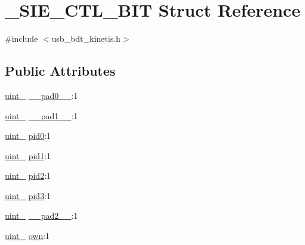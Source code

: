 \hypertarget{struct___s_i_e___c_t_l___b_i_t}{}\section{\+\_\+\+S\+I\+E\+\_\+\+C\+T\+L\+\_\+\+B\+IT Struct Reference}
\label{struct___s_i_e___c_t_l___b_i_t}


{\ttfamily \#include $<$usb\+\_\+bdt\+\_\+kinetis.\+h$>$}

\subsection*{Public Attributes}
\begin{DoxyCompactItemize}
\item 
\hyperlink{types_8h_ad3209046c23f739a81581c10a4be7d92}{uint\+\_} \hyperlink{struct___s_i_e___c_t_l___b_i_t_a89dc65f6660587a4914d62e005f32607}{\+\_\+\+\_\+pad0\+\_\+\+\_\+}\+:1
\item 
\hyperlink{types_8h_ad3209046c23f739a81581c10a4be7d92}{uint\+\_} \hyperlink{struct___s_i_e___c_t_l___b_i_t_a5a35cc1ec0035e0f1be992c18857a8b2}{\+\_\+\+\_\+pad1\+\_\+\+\_\+}\+:1
\item 
\hyperlink{types_8h_ad3209046c23f739a81581c10a4be7d92}{uint\+\_} \hyperlink{struct___s_i_e___c_t_l___b_i_t_a0b5e23e6030cbc40b1435185eee883b5}{pid0}\+:1
\item 
\hyperlink{types_8h_ad3209046c23f739a81581c10a4be7d92}{uint\+\_} \hyperlink{struct___s_i_e___c_t_l___b_i_t_a18fdff82280502521ab7c3fc987c77d2}{pid1}\+:1
\item 
\hyperlink{types_8h_ad3209046c23f739a81581c10a4be7d92}{uint\+\_} \hyperlink{struct___s_i_e___c_t_l___b_i_t_a32f6384fbb76a43f9b2f180727e06609}{pid2}\+:1
\item 
\hyperlink{types_8h_ad3209046c23f739a81581c10a4be7d92}{uint\+\_} \hyperlink{struct___s_i_e___c_t_l___b_i_t_a1936a9b54096104134e40bd17104bf1f}{pid3}\+:1
\item 
\hyperlink{types_8h_ad3209046c23f739a81581c10a4be7d92}{uint\+\_} \hyperlink{struct___s_i_e___c_t_l___b_i_t_abe310946d64b07e6a852c88b3e7eccbb}{\+\_\+\+\_\+pad2\+\_\+\+\_\+}\+:1
\item 
\hyperlink{types_8h_ad3209046c23f739a81581c10a4be7d92}{uint\+\_} \hyperlink{struct___s_i_e___c_t_l___b_i_t_a15e9dce6adb1492773bf669c677c4f69}{own}\+:1
\end{DoxyCompactItemize}


